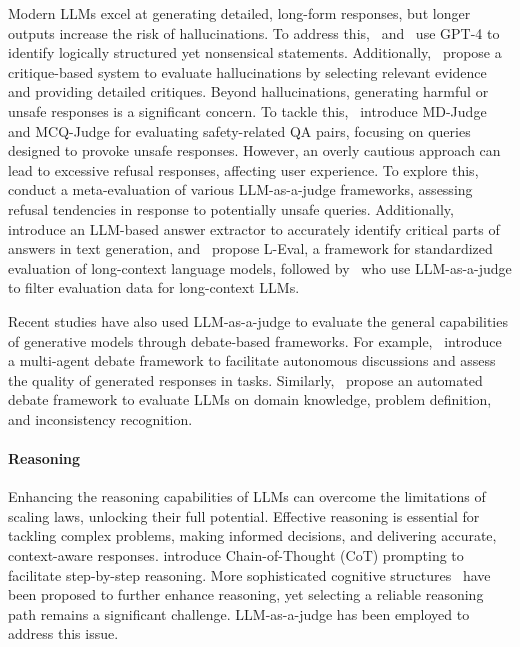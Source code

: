 \documentclass[acmsmall,screen]{acmart}
\begin{document}
Modern LLMs excel at generating detailed, long-form responses, but longer outputs increase the risk of hallucinations. To address this,~\citet{cheng2023evaluating} and~\citet{zhang2024balancing} use GPT-4 to identify logically structured yet nonsensical statements. Additionally,~\citet{wang2024halu} propose a critique-based system to evaluate hallucinations by selecting relevant evidence and providing detailed critiques. Beyond hallucinations, generating harmful or unsafe responses is a significant concern. To tackle this,~\citet{salad_bench} introduce MD-Judge and MCQ-Judge for evaluating safety-related QA pairs, focusing on queries designed to provoke unsafe responses. However, an overly cautious approach can lead to excessive refusal responses, affecting user experience. To explore this,~\citet{xie2024sorry} conduct a meta-evaluation of various LLM-as-a-judge frameworks, assessing refusal tendencies in response to potentially unsafe queries. Additionally,~\citet{yu2024xfinder} introduce an LLM-based answer extractor to accurately identify critical parts of answers in text generation, and~\citet{an2023eval} propose L-Eval, a framework for standardized evaluation of long-context language models, followed by~\citet{bai2024longbench} who use LLM-as-a-judge to filter evaluation data for long-context LLMs.

Recent studies have also used LLM-as-a-judge to evaluate the general capabilities of generative models through debate-based frameworks. For example,~\citet{chanchateval} introduce a multi-agent debate framework to facilitate autonomous discussions and assess the quality of generated responses in tasks. Similarly,~\citet{moniri2024evaluating} propose an automated debate framework to evaluate LLMs on domain knowledge, problem definition, and inconsistency recognition.

\paragraph{\textbf{Reasoning}}  
Enhancing the reasoning capabilities of LLMs can overcome the limitations of scaling laws, unlocking their full potential. Effective reasoning is essential for tackling complex problems, making informed decisions, and delivering accurate, context-aware responses. 
\citet{cot} introduce Chain-of-Thought (CoT) prompting to facilitate step-by-step reasoning. More sophisticated cognitive structures~\cite{yao2023tree,hao2023reasoning} have been proposed to further enhance reasoning, yet selecting a reliable reasoning path remains a significant challenge. LLM-as-a-judge has been employed to address this issue.
\end{document}
